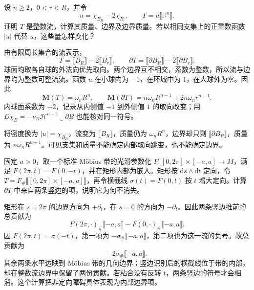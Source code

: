 \begin{exercise}\label{g3:ex:integer-bv-concentric-current}
	设 \(n\ge2\)，\(0<r<R\)，并令
	\[
		u=\chi_{B_R}-2\chi_{B_r},\qquad
		T=u\lBrack\mathbb R^n\rBrack.
	\]
	证明 \(T\) 是整数流，计算其质量、边界及边界质量。若以相同支集上的正重数函数 \(|u|\) 代替 \(u\)，这些量怎样变化？
\end{exercise}
\begin{solution}
	由有限周长集合的流表示，
	\[
		T=\lBrack B_R\rBrack-2\lBrack B_r\rBrack,
		\qquad
		\partial T=\lBrack\partial B_R\rBrack-2\lBrack\partial B_r\rBrack.
	\]
	球面均取各自球的外法向优先取向。两个边界互不相交，系数为整数，所以流与边界均为整数可整流流。函数 \(u\) 在小球内为 \(-1\)，在环域中为 \(1\)，在大球外为零。因此
	\[
		\mathbf M(T)=\omega_nR^n,
		\qquad \mathbf M(\partial T)
		=n\omega_nR^{n-1}+2n\omega_nr^{n-1}.
	\]
	内球面系数为 \(-2\)，记录从内侧值 \(-1\) 到外侧值 \(1\) 的取向改变；用 \(D\chi_B=-\nu_B\mathcal H^{n-1}\llcorner\partial B\) 也能核对同一符号。

	将密度换为 \(|u|=\chi_{B_R}\)，流变为 \(\lBrack B_R\rBrack\)，质量仍为 \(\omega_nR^n\)，边界却只剩 \(\lBrack\partial B_R\rBrack\)，质量为 \(n\omega_nR^{n-1}\)。可见支集和质量不能确定内部取向跳变，也不能确定边界。
\end{solution}

\begin{exercise}\label{g3:ex:mobius-cut-boundary}
	固定 \(a>0\)，取一个标准 Möbius 带的光滑参数化 \(F:[0,2\pi]\times[-a,a]\to M\)，满足 \(F(2\pi,t)=F(0,-t)\)，并在矩形内部为嵌入。矩形按 \(\mathrm ds\wedge\mathrm dt\) 定向，令 \(T=F_\#\lBrack[0,2\pi]\times[-a,a]\rBrack\)，再令横截线 \(\sigma(t)=F(0,t)\) 按 \(t\) 增大定向。计算 \(\partial T\) 中来自两条竖边的项，说明它为何不消失。
\end{exercise}
\begin{solution}
	矩形在 \(s=2\pi\) 的边界方向为 \(+\partial_t\)，在 \(s=0\) 的方向为 \(-\partial_t\)。因此两条竖边推前的总贡献为
	\[
		F(2\pi,\cdot)_\#\lBrack-a,a\rBrack
		-F(0,\cdot)_\#\lBrack-a,a\rBrack.
	\]
	因 \(F(2\pi,t)=\sigma(-t)\)，第一项为 \(-\sigma_\#\lBrack-a,a\rBrack\)，第二项也为这一流的负号。故总贡献为
	\[
		-2\sigma_\#\lBrack-a,a\rBrack.
	\]
	其余两条水平边映到 Möbius 带的几何边界；竖边识别后的横截线位于带的内部，却在整数流边界中保留了两份贡献。若粘合没有反转 \(t\)，两条竖边的符号才会相消。这个计算把非定向障碍具体表现为内部边界项。
\end{solution}

